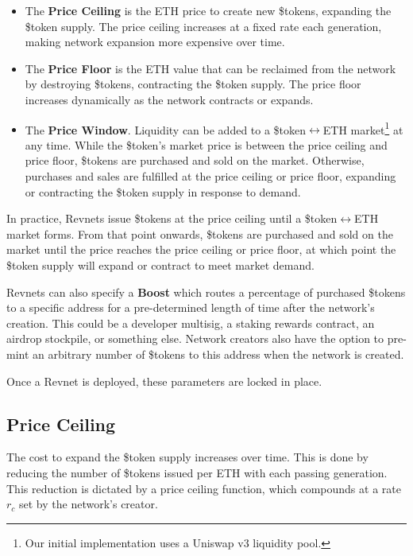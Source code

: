 \documentclass{article}
\begin{document}
\begin{itemize}
  \item The \textbf{Price Ceiling} is the ETH price to create new \$tokens, expanding the \$token supply. The price ceiling increases at a fixed rate each generation, making network expansion more expensive over time.
  \item The \textbf{Price Floor} is the ETH value that can be reclaimed from the network by destroying \$tokens, contracting the \$token supply. The price floor increases dynamically as the network contracts or expands.
  \item The \textbf{Price Window}. Liquidity can be added to a \$token$\leftrightarrow$ETH market\footnote{Our initial implementation uses a Uniswap v3 liquidity pool.} at any time. While the \$token's market price is between the price ceiling and price floor, \$tokens are purchased and sold on the market. Otherwise, purchases and sales are fulfilled at the price ceiling or price floor, expanding or contracting the \$token supply in response to demand.
\end{itemize}

In practice, Revnets issue \$tokens at the price ceiling until a \$token$\leftrightarrow$ETH market forms. From that point onwards, \$tokens are purchased and sold on the market until the price reaches the price ceiling or price floor, at which point the \$token supply will expand or contract to meet market demand.


Revnets can also specify a \textbf{Boost} which routes a percentage of purchased \$tokens to a specific address for a pre-determined length of time after the network's creation. This could be a developer multisig, a staking rewards contract, an airdrop stockpile, or something else. Network creators also have the option to pre-mint an arbitrary number of \$tokens to this address when the network is created.

Once a Revnet is deployed, these parameters are locked in place.

\subsection{Price Ceiling}

The cost to expand the \$token supply increases over time. This is done by reducing the number of \$tokens issued per ETH with each passing generation. This reduction is dictated by a price ceiling function, which compounds at a rate $r_c$ set by the network's creator.
\end{document}
